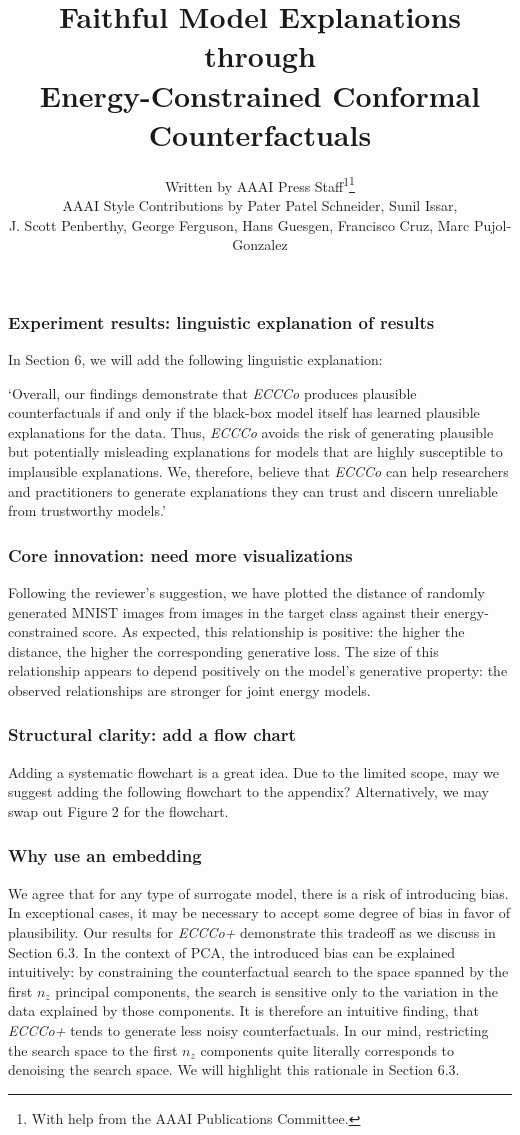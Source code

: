 \documentclass[letterpaper]{article} %
\title{Faithful Model Explanations through\\
Energy-Constrained Conformal Counterfactuals}
\author{
    Written by AAAI Press Staff\textsuperscript{\rm 1}\thanks{With help from the AAAI Publications Committee.}\\
    AAAI Style Contributions by Pater Patel Schneider,
    Sunil Issar,\\
    J. Scott Penberthy,
    George Ferguson,
    Hans Guesgen,
    Francisco Cruz\equalcontrib,
    Marc Pujol-Gonzalez\equalcontrib
}
\begin{document}
\subsubsection{Experiment results: linguistic explanation of results} 

In Section 6, we will add the following linguistic explanation: 

`Overall, our findings demonstrate that \textit{ECCCo} produces plausible counterfactuals if and only if the black-box model itself has learned plausible explanations for the data. Thus, \textit{ECCCo} avoids the risk of generating plausible but potentially misleading explanations for models that are highly susceptible to implausible explanations. We, therefore, believe that \textit{ECCCo} can help researchers and practitioners to generate explanations they can trust and discern unreliable from trustworthy models.'

\subsubsection{Core innovation: need more visualizations} 

Following the reviewer's suggestion, we have plotted the distance of randomly generated MNIST images from images in the target class against their energy-constrained score. As expected, this relationship is positive: the higher the distance, the higher the corresponding generative loss. The size of this relationship appears to depend positively on the model's generative property: the observed relationships are stronger for joint energy models. 

\subsubsection{Structural clarity: add a flow chart} 

Adding a systematic flowchart is a great idea. Due to the limited scope, may we suggest adding the following flowchart to the appendix? Alternatively, we may swap out Figure 2 for the flowchart. 

\subsubsection{Why use an embedding}

We agree that for any type of surrogate model, there is a risk of introducing bias. In exceptional cases, it may be necessary to accept some degree of bias in favor of plausibility. Our results for \textit{ECCCo+} demonstrate this tradeoff as we discuss in Section 6.3. In the context of PCA, the introduced bias can be explained intuitively: by constraining the counterfactual search to the space spanned by the first $n_z$ principal components, the search is sensitive only to the variation in the data explained by those components. It is therefore an intuitive finding, that \textit{ECCCo+} tends to generate less noisy counterfactuals. In our mind, restricting the search space to the first $n_z$ components quite literally corresponds to denoising the search space. We will highlight this rationale in Section 6.3.
\end{document}
